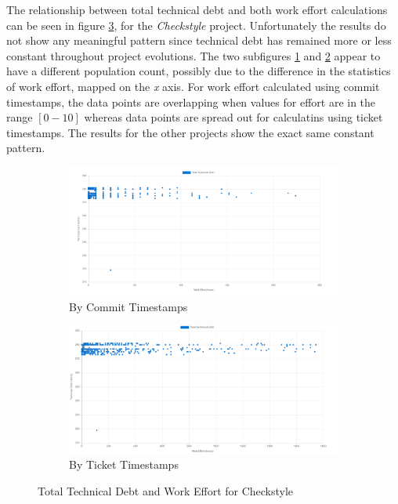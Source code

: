 \documentclass{mpaper}
\begin{document}
The relationship between total technical debt and both work effort calculations
can be seen in figure \ref{fig:td-total-debt}, for the \emph{Checkstyle}
project. Unfortunately the results do not show any meaningful pattern since
technical debt has remained more or less constant throughout project evolutions.
The two subfigures \ref{fig:td-total-debt-commit} and
\ref{fig:td-total-debt-ticket} appear to have a different population count,
possibly due to the difference in the statistics of work effort, mapped on the
\emph{x} axis. For work effort calculated using commit timestamps, the data
points are overlapping when values for effort are in the range $[0-10]$ whereas
data points are spread out for calculatins using ticket timestamps. The results
for the other projects show the exact same constant pattern. 

\begin{figure}
	\centering
	\begin{subfigure}{.45\textwidth}
		\includegraphics[width=\linewidth]{images/checkstyle_total_debt_commit.png}
		\caption{By Commit Timestamps}
		\label{fig:td-total-debt-commit}
	\end{subfigure}
	\begin{subfigure}{.45\textwidth}
		\includegraphics[width=\linewidth]{images/checkstyle_total_debt_ticket.png}
		\caption{By Ticket Timestamps}
		\label{fig:td-total-debt-ticket}
	\end{subfigure}
	\caption{Total Technical Debt and Work Effort for Checkstyle}
	\label{fig:td-total-debt}
\end{figure}
\end{document}
